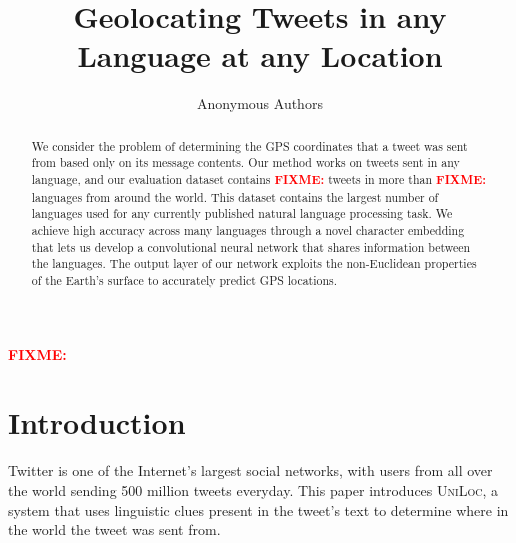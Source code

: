 \documentclass[sigconf,10pt]{acmart}
\title{Geolocating Tweets in any Language at any Location}
\author{Anonymous Authors}
\affiliation{}
\newcommand{\fixme}[1]{\textcolor{red}{\textbf{FIXME:} {#1}}}
\newcommand{\uniloc}{\textsc{UniLoc}}
\begin{document}
\begin{abstract}
    We consider the problem of determining the GPS coordinates that a tweet was sent from based only on its message contents.
    Our method works on tweets sent in any language,
    and our evaluation dataset contains \fixme{} tweets in more than \fixme{} languages from around the world.
    This dataset contains the largest number of languages used for any currently published natural language processing task.
    We achieve high accuracy across many languages through a novel character embedding that lets us develop a convolutional neural network that shares information between the languages.
    The output layer of our network exploits the non-Euclidean properties of the Earth's surface to accurately predict GPS locations.
\end{abstract}

%
%
\begin{CCSXML}
    \fixme{}
\end{CCSXML}



\keywords{\fixme{}}

\maketitle

\newpage
\section{Introduction}

Twitter is one of the Internet's largest social networks,
with users from all over the world sending 500 million tweets everyday.
This paper introduces \uniloc, 
a system that uses linguistic clues present in the tweet's text to determine where in the world the tweet was sent from.
\end{document}
